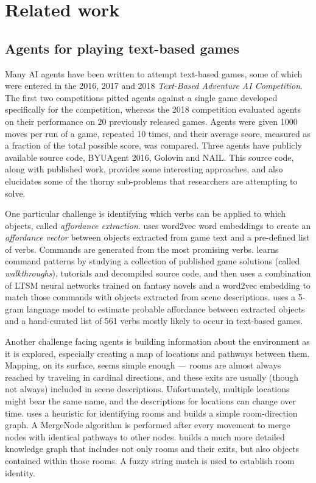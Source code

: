 \section{Related work}

\subsection{Agents for playing text-based games}

Many AI agents have been written to attempt text-based games, some of
which were entered in the 2016, 2017 and 2018 \emph{Text-Based Adventure
AI Competition}. The first two competitions pitted agents against a
single game developed specifically for the competition, whereas the 2018
competition evaluated agents on their performance on 20 previously
released games\cite{atkinson_text-based_2019}. Agents were given 1000
moves per run of a game, repeated 10 times, and their average score,
measured as a fraction of the total possible score, was compared.  Three
agents have publicly available source code, BYUAgent
2016\cite{ricks_byu-agent-2016_2019}, Golovin\cite{kostka2017text} and
NAIL\cite{hausknecht_nail_2019}. This source code, along with published
work, provides some interesting approaches, and also elucidates some of
the thorny sub-problems that researchers are attempting to solve.

One particular challenge is identifying which verbs can be applied to
which objects, called \emph{affordance extraction}.  uses word2vec word embeddings to create an \emph{affordance
vector} between objects extracted from game text and a pre-defined list
of verbs. Commands are generated from the most promising
verbs.\cite{atkinson_text-based_2019}
 learns command patterns by studying a collection of
published game solutions (called \emph{walkthroughs}), tutorials and
decompiled source code, and then uses a combination of LTSM neural
networks trained on fantasy novels and a word2vec embedding to match
those commands with objects extracted from scene
descriptions.\cite{kostka2017text}
 uses a 5-gram language model to estimate probable
affordance between extracted objects and a hand-curated list of 561
verbs mostly likely to occur in text-based
games.\cite{hausknecht_nail_2019}

Another challenge facing agents is building information about the
environment as it is explored, especially creating a map of locations
and pathways between them. Mapping, on its surface, seems simple enough
--- rooms are almost always reached by traveling in cardinal directions,
and these exits are usually (though not always) included in scene
descriptions. Unfortunately, multiple locations might bear the same
name, and the descriptions for locations can change over
time.  uses a heuristic for
identifying rooms and builds a simple room-direction graph. A MergeNode
algorithm is performed after every movement to merge nodes with
identical pathways to other nodes\cite{kostka2017text}. 
builds a much more detailed knowledge graph that includes not only rooms
and their exits, but also objects contained within those rooms. A fuzzy
string match is used to establish room
identity\cite{hausknecht_nail_2019}.

